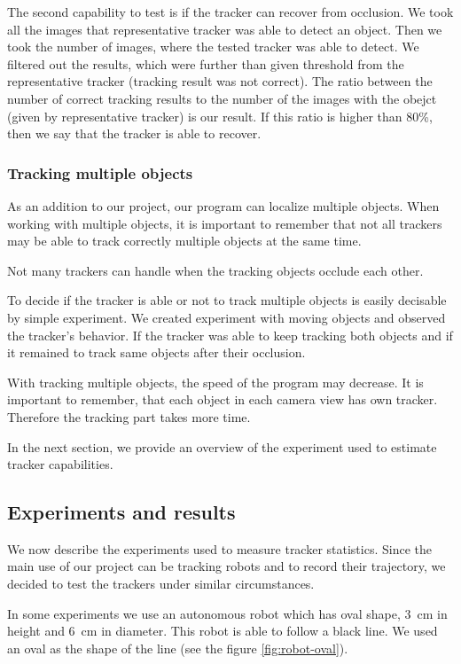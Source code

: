 The second capability to test is if the tracker can recover from occlusion.
We took all the images that representative tracker was able to detect an
object. Then we took the number of images, where the tested tracker was able to
detect. We filtered out the results, which were further than given threshold
from the representative tracker (tracking result was not correct). The ratio
between the number of correct tracking results to the number of the images with
the obejct (given by representative tracker) is our result. If this ratio is
higher than 80\%, then we say that the tracker is able to recover.

\subsubsection*{Tracking multiple objects}

As an addition to our project, our program can localize multiple objects. When
working with multiple objects, it is important to remember that not all
trackers may be able to track correctly multiple objects at the same time.

Not many trackers can handle when the tracking objects occlude each other.

To decide if the tracker is able or not to track multiple objects is easily
decisable by simple experiment. We created experiment with moving objects and
observed the tracker's behavior. If the tracker was able to keep tracking both
objects and if it remained to track same objects after their occlusion.

With tracking multiple objects, the speed of the program may decrease.
It is important to remember, that each object in each camera view has own
tracker. Therefore the tracking part takes more time.

In the next section, we provide an overview of the experiment used to estimate
tracker capabilities.


\subsection{Experiments and results}

We now describe the experiments used to measure tracker statistics. Since the
main use of our project can be tracking robots and to record their trajectory,
we decided to test the trackers under similar circumstances.

In some experiments we use an autonomous robot which has oval shape, 3~cm
in height and 6~cm in diameter. This robot is able to follow a black line.
We used an oval as the shape of the line (see the figure \ref{fig:robot-oval}).

